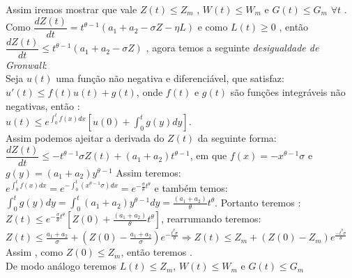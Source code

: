 \documentclass[12pt,a4paper]{article}
\begin{document}
\vspace{5mm}
\noindent Assim iremos mostrar que vale $Z(t) \leq Z_m$ , $W(t) \leq W_m$ e $G(t) \leq G_m$ $\forall t$ .\\

\vspace{4mm}
\noindent Como $\dfrac{dZ(t)}{dt} = t^{\theta - 1}(a_1 + a_2 - \sigma Z - \eta L)$ e como $L(t) \geq 0$ , então \vspace{1mm}\\ $\dfrac{dZ(t)}{dt} \leq t^{\theta - 1}(a_1 + a_2 - \sigma Z) $ , agora temos a seguinte \textit{desigualdade de Gronwall}:\vspace{3mm}\\
Seja $u(t)$ uma função não negativa e diferenciável, que satisfaz:\\
$u'(t) \leq f(t) u(t) + g(t)$, onde $f(t)$ e $g(t)$ são funções integráveis não negativas, então :\vspace{2mm}\\
$u(t) \leq e^{\int_0 ^t f(x) dx} [u(0) + \int_0 ^t g(y)dy]$.\\

\vspace{3mm}
\noindent Assim podemos ajeitar a derivada do $Z(t)$ da seguinte forma:\\
$\dfrac{d Z(t)}{dt} \leq -t^{\theta - 1} \sigma Z(t) + (a_1 + a_2)t^{\theta - 1}$, em que $f(x) = -x^{\theta - 1} \sigma$ e $g(y) = (a_1 + a_2)y^{\theta - 1}$
\newpage
\noindent Assim teremos:\\

$e^{\int_0^t f(x) dx} = e^{-\int_0^t (x^{\theta - 1}\sigma) dx} = e^{-\frac{\sigma}{\theta} t^\theta}$ e também temos:\\

$\int_0^t g(y) dy = \int_0^t (a_1+a_2)y^{\theta-1}dy = \frac{(a_1 + a_2)}{\theta}t^\theta $. Portanto teremos :\\

$Z(t) \leq e^{-\frac{\sigma}{\theta} t^\theta} [Z(0) + \frac{(a_1 + a_2)}{\theta}t^\theta]$, rearrumando teremos:\vspace{2mm}\\
$Z(t) \leq \frac{a_1 + a_2}{\sigma} + (Z(0) - \frac{a_1 + a_2}{\sigma})e^{-\frac{t^\theta \sigma}{\theta}} \Longrightarrow Z(t) \leq Z_m + (Z(0) - Z_m) e^{\frac{-t^\theta \sigma}{\theta}}$\\

Assim , como $Z(0) \leq Z_m$, então teremos . \vspace{1mm}\\
De modo análogo teremos $L(t) \leq Z_m$, $W(t) \leq W_m$ e $G(t) \leq G_m$
\end{document}
